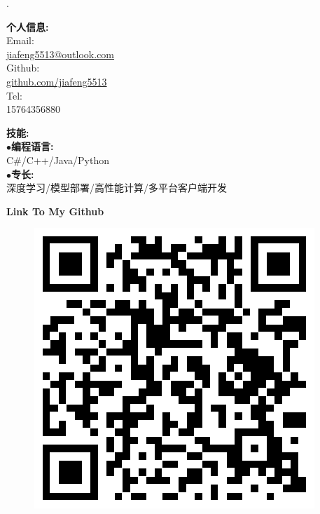 \documentclass[a4paper,12pt,final]{memoir}
\newcommand{\myThemeColor}{RoyalBlue}
\newcommand{\SmallSep}{\vspace{0.9em}}
\newcommand{\CVItem}[1]
	{\textbf{\color{\myThemeColor} #1}}
\begin{document}
\begin{flushright}\footnotesize
.\\
\vskip 6cm
    \raggedright
	\CVItem{{\large 个人信息:}}\\
	Email:\\
	\href{mailto:jiafeng5513@outlook.com}{jiafeng5513@outlook.com}  \\
	Github:\\
	\href{github.com/jiafeng5513}{github.com/jiafeng5513} \\
	Tel:\\
	15764356880
	\SmallSep
	\SmallSep

	\CVItem{{\large 技能:}}\\
	$\bullet$\textbf{编程语言:}\\ C\#/C++/Java/Python\\
	$\bullet$\textbf{专长:}\\ 深度学习/模型部署/高性能计算/多平台客户端开发 \\

	\SmallSep
	\SmallSep
	\SmallSep
	
	\CVItem{\large Link To My Github}
	\begin{figure}[h]
		\centering
		\includegraphics[width=0.8\columnwidth]{../img/Github.png}
	\end{figure}
	

\end{flushright}\normalsize
\framebreak
\end{document}
